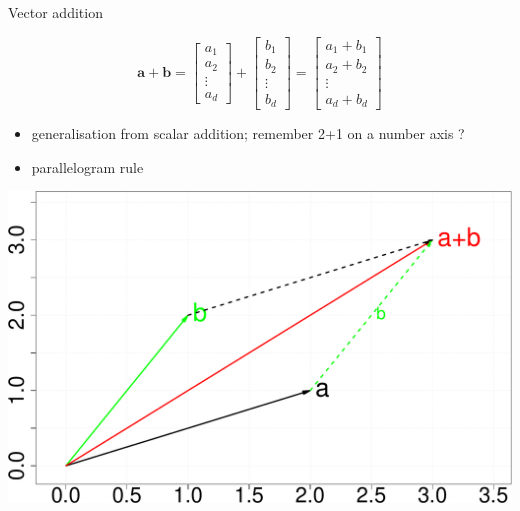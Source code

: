 \documentclass{scrartcl}
\def\tightlist{}
\newcommand{\vv}[1]{\boldsymbol{#1}}
\begin{document}
\begin{frame}{Vector addition}
\protect\hypertarget{vector-addition}{}

\[\vv{a}+\vv{b} = \begin{bmatrix}
           a_1 \\
           a_2 \\
           \vdots\\
           a_d
         \end{bmatrix} +  \begin{bmatrix}
           b_1 \\
           b_2 \\
           \vdots\\
           b_d
         \end{bmatrix} = \begin{bmatrix}
           a_1+b_1 \\
           a_2+b_2 \\
           \vdots\\
           a_d+b_d
         \end{bmatrix}\]

\begin{itemize}
\tightlist
\item
  generalisation from scalar addition; remember 2+1 on a number axis ?
\item
  parallelogram rule \bigskip
\end{itemize}

\begin{center}\includegraphics[width=0.5\linewidth]{math4ml_files/figure-beamer/unnamed-chunk-3-1} \end{center}

\end{frame}
\end{document}
